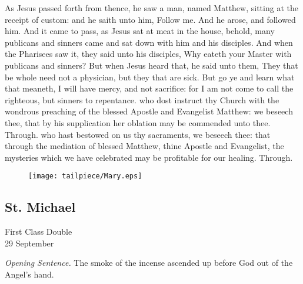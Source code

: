 
 As Jesus passed forth from thence, he saw a man, named Matthew, sitting at the receipt of custom: and he saith unto him, Follow me. And he arose, and followed him. And it came to pass, as Jesus sat at meat in the house, behold, many publicans and sinners came and sat down with him and his disciples. And when the Pharisees saw it, they said unto his disciples, Why eateth your Master with publicans and sinners? But when Jesus heard that, he said unto them, They that be whole need not a physician, but they that are sick. But go ye and learn what that meaneth, I will have mercy, and not sacrifice: for I am not come to call the righteous, but sinners to repentance.
\secret
{} who dost instruct thy Church with the wondrous preaching of the blessed Apostle and Evangelist Matthew: we beseech thee, that by his supplication her oblation may be commended unto thee. Through.
\postcommunion
{} who hast bestowed on us thy sacraments, we beseech thee: that through the mediation of blessed Matthew, thine Apostle and Evangelist, the mysteries which we have celebrated may be profitable for our healing. Through.


\vfill

  \begin{figure}[H]
  	\centering
  	\texttt{[image: tailpiece/Mary.eps]}
  \end{figure}
  
\clearpage
\subsection{St. Michael}
\begin{inhead}
    {First Class Double\\
29 September}
\end{inhead}
\par\noindent
\textit{Opening Sentence.} The smoke of the incense ascended up before God out of the Angel's hand.

